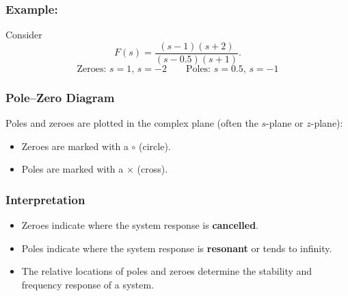 \documentclass[a4paper,12pt]{article}
\begin{document}
\subsubsection{Example:}
Consider
\[
F(s) = \frac{(s-1)(s+2)}{(s-0.5)(s+1)}.
\]
\[
\text{Zeroes: } s=1, \, s=-2 \qquad
\text{Poles: } s=0.5, \, s=-1
\]

\subsubsection{Pole–Zero Diagram}
Poles and zeroes are plotted in the complex plane (often the $s$-plane or $z$-plane):
\begin{itemize}
    \item Zeroes are marked with a $\circ$ (circle).
    \item Poles are marked with a $\times$ (cross).
\end{itemize}

\begin{center}
\end{center}

\subsubsection{Interpretation}
\begin{itemize}
    \item Zeroes indicate where the system response is \textbf{cancelled}.
    \item Poles indicate where the system response is \textbf{resonant} or tends to infinity.
    \item The relative locations of poles and zeroes determine the stability and frequency response of a system.
\end{itemize}
\end{document}
